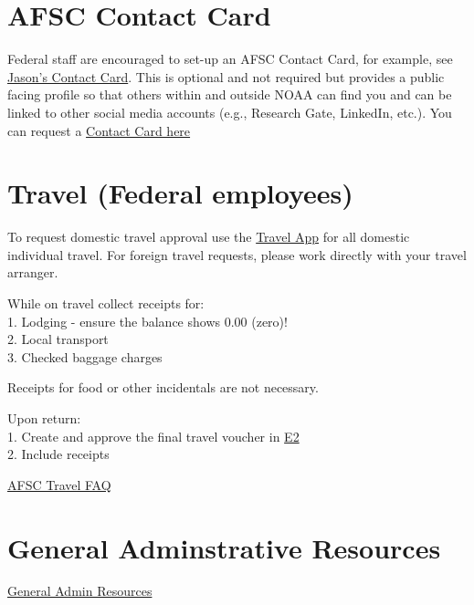 \documentclass[
  letterpaper,
  DIV=11,
  numbers=noendperiod]{scrreprt}
\begin{document}
\section{AFSC Contact Card}\label{afsc-contact-card}

Federal staff are encouraged to set-up an AFSC Contact Card, for
example, see
\href{https://www.fisheries.noaa.gov/contact/jason-e-jannot}{Jason's
Contact Card}. This is optional and not required but provides a public
facing profile so that others within and outside NOAA can find you and
can be linked to other social media accounts (e.g., Research Gate,
LinkedIn, etc.). You can request a
\href{https://docs.google.com/forms/d/e/1FAIpQLSdDfxoDycZjcmXDfPY_KnHwb2vPQ8HTzfFCSVt-qOvq_xPIZw/viewform}{Contact
Card here}

\section{Travel (Federal employees)}\label{travel-federal-employees}

To request domestic travel approval use the
\href{https://script.google.com/a/macros/noaa.gov/s/AKfycbwdQxgdDdWfoH_4bBK9xMfShQaqMPNogkTZx-VgC6tTx3aUMDogSxwEGWHWnAcZMSv4/exec}{Travel
App} for all domestic individual travel. For foreign travel requests,
please work directly with your travel arranger.

While on travel collect receipts for:\\
1. Lodging - ensure the balance shows 0.00 (zero)!\\
2. Local transport\\
3. Checked baggage charges

Receipts for food or other incidentals are not necessary.

Upon return:\\
1. Create and approve the final travel voucher in
\href{https://e2.gov.cwtsatotravel.com/}{E2}\\
2. Include receipts

\href{https://sites.google.com/noaa.gov/myafsc/administrative/travel}{AFSC
Travel FAQ}

\section{General Adminstrative
Resources}\label{general-adminstrative-resources}

\href{https://sites.google.com/noaa.gov/myafsc/administrative/general-admin}{General
Admin Resources}
\end{document}
